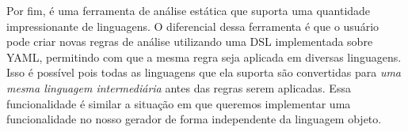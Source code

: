 Por fim, \cite{r2c:semgrep} é uma ferramenta de análise estática que suporta uma
quantidade impressionante de linguagens. O diferencial dessa ferramenta é que
o usuário pode criar novas regras de análise utilizando uma DSL implementada sobre
YAML, permitindo com que a mesma regra seja aplicada em diversas linguagens. Isso
é possível pois todas as linguagens que ela suporta são convertidas para
\textit{uma mesma linguagem intermediária} antes das regras serem aplicadas. Essa
funcionalidade é similar a situação em que queremos implementar uma funcionalidade
no nosso gerador de forma independente da linguagem objeto.
